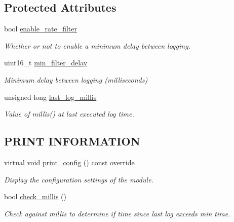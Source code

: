 \subsection*{Protected Attributes}
\begin{DoxyCompactItemize}
\item 
bool \hyperlink{class_loom_log_plat_a6d343b76b79a1e51572bcf2991966e61}{enable\+\_\+rate\+\_\+filter}
\begin{DoxyCompactList}\small\item\em Whether or not to enable a minimum delay between logging. \end{DoxyCompactList}\item 
uint16\+\_\+t \hyperlink{class_loom_log_plat_a3d4ffe4204560b9677b8007be7f522be}{min\+\_\+filter\+\_\+delay}
\begin{DoxyCompactList}\small\item\em Minimum delay between logging (milliseconds) \end{DoxyCompactList}\item 
unsigned long \hyperlink{class_loom_log_plat_aa6ad61d7d6c126aa13dcc91debef67e3}{last\+\_\+log\+\_\+millis}
\begin{DoxyCompactList}\small\item\em Value of millis() at last executed log time. \end{DoxyCompactList}\end{DoxyCompactItemize}
\subsection*{P\+R\+I\+NT I\+N\+F\+O\+R\+M\+A\+T\+I\+ON}
\begin{DoxyCompactItemize}
\item 
virtual void \hyperlink{class_loom_log_plat_afd1780573d350f46ce26d237a4ade43b}{print\+\_\+config} () const override
\begin{DoxyCompactList}\small\item\em Display the configuration settings of the module. \end{DoxyCompactList}\item 
bool \hyperlink{class_loom_log_plat_a74520318a9427997df80f98f924a0e48}{check\+\_\+millis} ()
\begin{DoxyCompactList}\small\item\em Check against millis to determine if time since last log exceeds min time. \end{DoxyCompactList}\end{DoxyCompactItemize}
